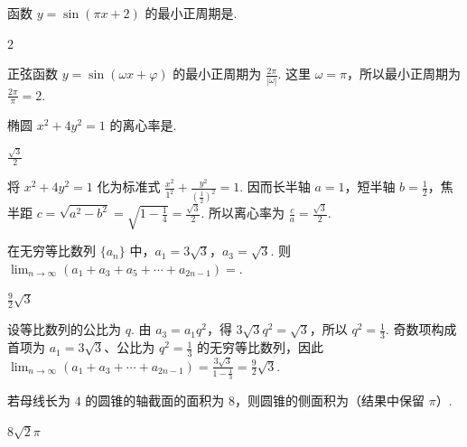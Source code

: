 \begin{problem}
函数 \(y = \sin(\pi x + 2)\) 的最小正周期是\fillinblank{}.
\end{problem}

\begin{answer}
\(2\)
\end{answer}

\begin{solution}
正弦函数 \(y=\sin(\omega x+\varphi)\) 的最小正周期为 \(\frac{2\pi}{|\omega|}\). 这里 \(\omega=\pi\)，所以最小正周期为 \(\frac{2\pi}{\pi}=2\).
\end{solution}

\begin{problem}
椭圆 \(x^2 + 4y^2 = 1\) 的离心率是\fillinblank{}.
\end{problem}

\begin{answer}
\(\frac{\sqrt{3}}{2}\)
\end{answer}

\begin{solution}
将 \(x^2+4y^2=1\) 化为标准式 \(\frac{x^2}{1^2}+\frac{y^2}{(\frac12)^2}=1\). 因而长半轴 \(a=1\)，短半轴 \(b=\frac12\)，焦半距 \(c=\sqrt{a^2-b^2}=\sqrt{1-\frac14}=\frac{\sqrt3}{2}\). 所以离心率为 \(\frac ca=\frac{\sqrt3}{2}\).
\end{solution}

\begin{problem}
在无穷等比数列 \(\{a_n\}\) 中，\(a_1 = 3\sqrt{3}\)，\(a_3 = \sqrt{3}\). 则 \(\displaystyle\lim_{n \to \infty}(a_1 + a_3 + a_5 + \cdots + a_{2n-1}) =\)\fillinblank{}.
\end{problem}

\begin{answer}
\(\frac{9}{2}\sqrt{3}\)
\end{answer}

\begin{solution}
设等比数列的公比为 \(q\). 由 \(a_3=a_1q^2\)，得 \(3\sqrt3q^2=\sqrt3\)，所以 \(q^2=\frac13\). 奇数项构成首项为 \(a_1=3\sqrt3\)、公比为 \(q^2=\frac13\) 的无穷等比数列，因此
\(\displaystyle\lim_{n\to\infty}(a_1+a_3+\cdots+a_{2n-1})=\frac{3\sqrt3}{1-\frac13}=\frac92\sqrt3\).
\end{solution}

\begin{problem}
若母线长为 \(4\) 的圆锥的轴截面的面积为 \(8\)，则圆锥的侧面积为\fillinblank{}（结果中保留 \(\pi\)）.
\end{problem}

\begin{answer}
\(8\sqrt{2}\pi\)
\end{answer}


